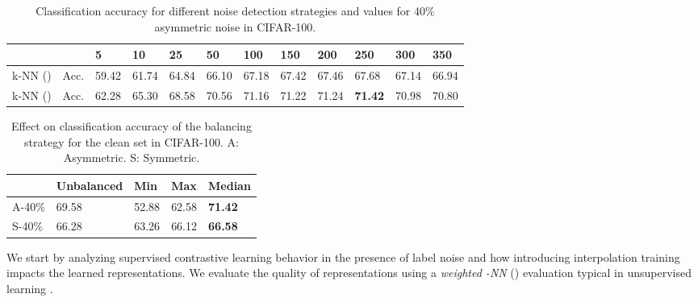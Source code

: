 \documentclass[final]{cvpr}
\begin{document}
\begin{table*}[t]
\begin{centering}
\caption{\label{tab:NoiseDetStudy}Classification accuracy for different noise detection strategies and  values for 40\% asymmetric noise in CIFAR-100.}
\medskip{}
\par\end{centering}
\centering{}\setlength{\tabcolsep}{4pt}{\small{}}\begin{tabular}{llllllllllll}
\toprule
 & {\small{}} & {\small{}5} & {\small{}10} & {\small{}25} & {\small{}50} & {\small{}100} & {\small{}150} & {\small{}200} & {\small{}250} & {\small{}300} & {\small{}350}\tabularnewline
\midrule
{\small{}k-NN ()} & {\small{}Acc.} & {\small{}59.42} & {\small{}61.74} & {\small{}64.84} & {\small{}66.10} & {\small{}67.18} & {\small{}67.42} & {\small{}67.46} & {\small{}67.68} & {\small{}67.14} & {\small{}66.94}\tabularnewline

{\small{}k-NN ()} & {\small{}Acc.} & {\small{}62.28} & {\small{}65.30} & {\small{}68.58} & {\small{}70.56} & {\small{}71.16} & {\small{}71.22} & {\small{}71.24} & \textbf{\small{}71.42} & {\small{}70.98} & {\small{}70.80}\tabularnewline
\bottomrule
\end{tabular}{\small\par}
\end{table*}
\begin{table}[t]
\centering{}\caption{\label{tab:Effect-of-balancing}Effect on classification accuracy of the balancing strategy for  the clean set   in CIFAR-100.
A: Asymmetric. S: Symmetric.}
\medskip{}
{\small{}}\begin{tabularx}{\columnwidth}{Xllll}
\toprule
 & {\small{}Unbalanced} & {\small{}Min} & {\small{}Max} & {\small{}Median}\tabularnewline
\midrule
{\small{}A-40\%} & {\small{}69.58} & {\small{}52.88} & {\small{}62.58} & \textbf{\small{}71.42}\tabularnewline

{\small{}S-40\%} & {\small{}66.28} & {\small{}63.26} & {\small{}66.12} & \textbf{\small{}66.58}\tabularnewline
\bottomrule
\end{tabularx}
\end{table}
We start by analyzing supervised contrastive learning behavior in the presence of label noise and how introducing interpolation training impacts the learned representations. We evaluate the quality of  representations using a \emph{weighted -NN} () evaluation typical in unsupervised learning \cite{2019_ICML_AND}.
\end{document}
